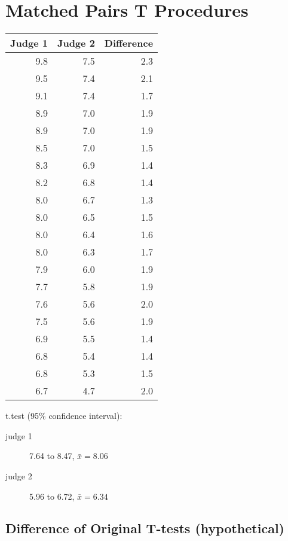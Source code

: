 \documentclass[letterpaper, landscape]{exam}
\begin{document}
  \section{Matched Pairs T Procedures} %

  \begin{table}[ht]
  \centering
    \begin{tabular}{rrr}
      \toprule
      Judge 1 & Judge 2 & Difference \\
      \midrule
      9.8     & 7.5     & 2.3 \\
      9.5     & 7.4     & 2.1 \\
      9.1     & 7.4     & 1.7 \\
      8.9     & 7.0     & 1.9 \\
      8.9     & 7.0     & 1.9 \\
      8.5     & 7.0     & 1.5 \\
      8.3     & 6.9     & 1.4 \\
      8.2     & 6.8     & 1.4 \\
      8.0     & 6.7     & 1.3 \\
      8.0     & 6.5     & 1.5 \\
      8.0     & 6.4     & 1.6 \\
      8.0     & 6.3     & 1.7 \\
      7.9     & 6.0     & 1.9 \\
      7.7     & 5.8     & 1.9 \\
      7.6     & 5.6     & 2.0 \\
      7.5     & 5.6     & 1.9 \\
      6.9     & 5.5     & 1.4 \\
      6.8     & 5.4     & 1.4 \\
      6.8     & 5.3     & 1.5 \\
      6.7     & 4.7     & 2.0 \\
      \bottomrule
    \end{tabular}
  \end{table}
  
  t.test (95\% confidence interval):
  \begin{description}
    \item[judge 1] 7.64 to 8.47, $\bar{x} = 8.06$
    \item[judge 2] 5.96 to 6.72, $\bar{x} = 6.34$
  \end{description}

  \subsection{Difference of Original T-tests (hypothetical)} %
  
\end{document}

